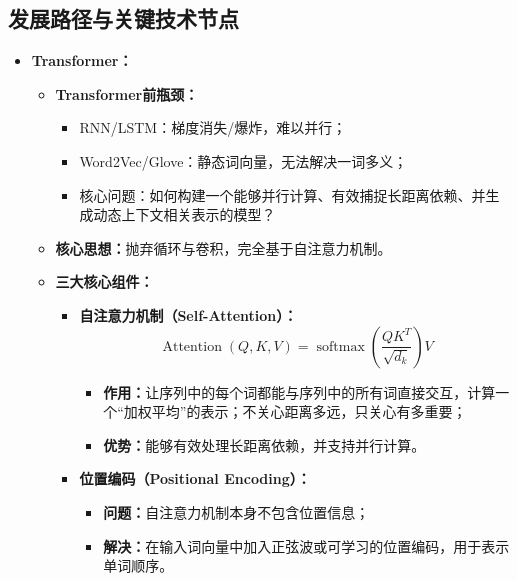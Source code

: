 \documentclass[../main.tex]{subfiles}
\begin{document}
\subsection{发展路径与关键技术节点}
\begin{itemize}
    \item \textbf{Transformer：}
    \begin{itemize}
        \item \textbf{Transformer前瓶颈：}
        \begin{itemize}
            \item RNN/LSTM：梯度消失/爆炸，难以并行；
            \item Word2Vec/Glove：静态词向量，无法解决一词多义；
            \item 核心问题：如何构建一个能够并行计算、有效捕捉长距离依赖、并生成动态上下文相关表示的模型？
        \end{itemize}
        \item \textbf{核心思想：}抛弃循环与卷积，完全基于自注意力机制。
        \item \textbf{三大核心组件：}
        \begin{itemize}
            \item \textbf{自注意力机制（Self-Attention）：}
            $$
            \operatorname{Attention}(Q,K,V)=\operatorname{softmax}\left(\frac{QK^T}{\sqrt{d_k}}\right)V
            $$
            \begin{itemize}
                \item \textbf{作用：}让序列中的每个词都能与序列中的所有词直接交互，计算一个“加权平均”的表示；不关心距离多远，只关心有多重要；
                \item \textbf{优势：}能够有效处理长距离依赖，并支持并行计算。
            \end{itemize}

            \item \textbf{位置编码（Positional Encoding）：}
            \begin{itemize}
                \item \textbf{问题：}自注意力机制本身不包含位置信息；
                \item \textbf{解决：}在输入词向量中加入正弦波或可学习的位置编码，用于表示单词顺序。
            \end{itemize}


\end{itemize}
\end{itemize}
\end{itemize}
\end{document}
